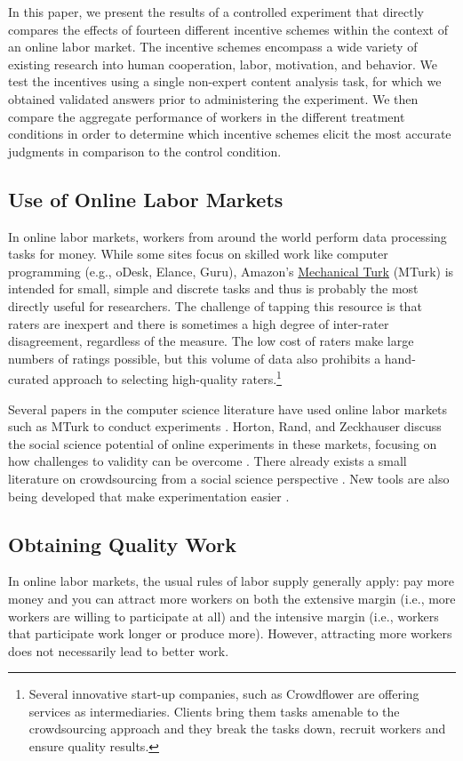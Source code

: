 \documentclass{chi2009}
\begin{document}
In this paper, we present the results of a controlled experiment that directly compares the effects of fourteen different incentive schemes within the context of an online labor market. The incentive schemes encompass a wide variety of existing research into human cooperation, labor, motivation, and behavior. We test the incentives using a single non-expert content analysis task, for which we obtained validated answers prior to administering the experiment. We then compare the aggregate performance of workers in the different treatment conditions in order to determine which incentive schemes elicit the most accurate judgments in comparison to the control condition. 

\subsection{Use of Online Labor Markets}
In online labor markets, workers from around the world perform data
processing tasks for money. While some sites focus on skilled work
like computer programming (e.g., oDesk, Elance, Guru), Amazon's
\href{https://www.mturk.com/mturk/welcome}{Mechanical Turk} (MTurk) is
intended for small, simple and discrete tasks and thus is probably the
most directly useful for researchers. The challenge of tapping this
resource is that raters are inexpert and there is sometimes a high
degree of inter-rater disagreement, regardless of the measure.  The
low cost of raters make large numbers of ratings possible, but this
volume of data also prohibits a hand-curated approach to selecting
high-quality raters.\footnote{Several innovative start-up companies,
  such as Crowdflower are offering services as intermediaries. Clients
  bring them tasks amenable to the crowdsourcing approach and they
  break the tasks down, recruit workers and ensure quality results.}

Several papers in the computer science literature have used online
labor markets such as MTurk to conduct experiments
\cite{kittur2008crowdsourcing, snow2008cheap, sheng2008get}. Horton,
Rand, and Zeckhauser discuss the social science potential of online
experiments in these markets, focusing on how challenges to validity
can be overcome \cite{hortonZeck2010}. There already exists a small
literature on crowdsourcing from a social science perspective
\cite{huberman-crowdsourcing, mason2009fip, horton2010labor,
  chen2009}. New tools are also being developed that make
experimentation easier \cite{little-turkit}.

\subsection{Obtaining Quality Work} 
In online labor markets, the usual rules of labor supply generally
apply: pay more money and you can attract more workers on both the
extensive margin (i.e., more workers are willing to participate at all) and the 
intensive margin (i.e., workers that participate work longer or produce more). However, attracting more workers does
not necessarily lead to better work. 
\end{document}
